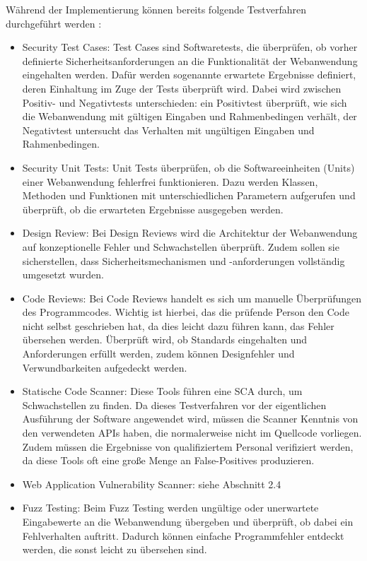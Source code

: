 \documentclass[12pt,oneside,a4paper,parskip,pointlessnumbers]{scrbook}
\begin{document}
  Während der Implementierung können bereits folgende Testverfahren durchgeführt werden \cite{BSI}:
  \begin{itemize}
    \item Security Test Cases:
    Test Cases sind Softwaretests, die überprüfen, ob vorher definierte Sicherheitsanforderungen an die Funktionalität der Webanwendung eingehalten werden. Dafür werden sogenannte erwartete Ergebnisse definiert, deren Einhaltung im Zuge der Tests überprüft wird. Dabei wird zwischen Positiv- und Negativtests unterschieden: ein Positivtest überprüft, wie sich die Webanwendung mit gültigen Eingaben und Rahmenbedingen verhält, der Negativtest untersucht das Verhalten mit ungültigen Eingaben und Rahmenbedingen.
    \item Security Unit Tests:
    Unit Tests überprüfen, ob die Softwareeinheiten (Units) einer Webanwendung fehlerfrei funktionieren. Dazu werden Klassen, Methoden und Funktionen mit unterschiedlichen Parametern aufgerufen und überprüft, ob die erwarteten Ergebnisse ausgegeben werden.
    \item Design Review:
    Bei Design Reviews wird die Architektur der Webanwendung auf konzeptionelle Fehler und Schwachstellen überprüft. Zudem sollen sie sicherstellen, dass Sicherheitsmechanismen und -anforderungen vollständig umgesetzt wurden.
    \item Code Reviews:
    Bei Code Reviews handelt es sich um manuelle Überprüfungen des Programmcodes. Wichtig ist hierbei, das die prüfende Person den Code nicht selbst geschrieben hat, da dies leicht dazu führen kann, das Fehler übersehen werden. Überprüft wird, ob Standards eingehalten und Anforderungen erfüllt werden, zudem können Designfehler und Verwundbarkeiten aufgedeckt werden.
    \item Statische Code Scanner:
    Diese Tools führen eine \ac{SCA} durch, um Schwachstellen zu finden. Da dieses Testverfahren vor der eigentlichen Ausführung der Software angewendet wird, müssen die Scanner Kenntnis von den verwendeten APIs haben, die normalerweise nicht im Quellcode vorliegen. Zudem müssen die Ergebnisse von qualifiziertem Personal verifiziert werden, da diese Tools oft eine große Menge an False-Positives produzieren.
    \item Web Application Vulnerability Scanner: siehe Abschnitt 2.4
    \item Fuzz Testing:
    Beim Fuzz Testing werden ungültige oder unerwartete Eingabewerte an die Webanwendung übergeben und überprüft, ob dabei ein Fehlverhalten auftritt. Dadurch können einfache Programmfehler entdeckt werden, die sonst leicht zu übersehen sind.
  \end{itemize}
\end{document}
